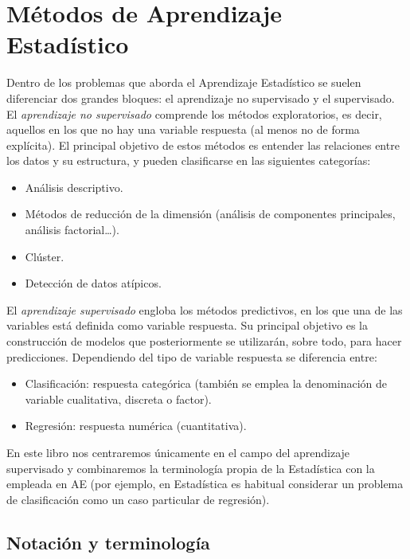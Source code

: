 \documentclass[
  spanish,
]{book}
\theoremstyle{break}
\theoremstyle{definition}
\theoremstyle{definition}
\theoremstyle{definition}
\theoremstyle{remark}
\begin{document}
\hypertarget{muxe9todos-de-aprendizaje-estaduxedstico}{%
\section{Métodos de Aprendizaje Estadístico}\label{muxe9todos-de-aprendizaje-estaduxedstico}}

Dentro de los problemas que aborda el Aprendizaje Estadístico se suelen diferenciar dos grandes bloques: el aprendizaje no supervisado y el supervisado. El \emph{aprendizaje no supervisado} comprende los métodos exploratorios, es decir, aquellos en los que no hay una variable respuesta (al menos no de forma explícita). El principal objetivo de estos métodos es entender las relaciones entre los datos y su estructura, y pueden clasificarse en las siguientes categorías:

\begin{itemize}
\item
  Análisis descriptivo.
\item
  Métodos de reducción de la dimensión (análisis de componentes principales, análisis factorial\ldots).
\item
  Clúster.
\item
  Detección de datos atípicos.
\end{itemize}

El \emph{aprendizaje supervisado} engloba los métodos predictivos, en los que una de las variables está definida como variable respuesta. Su principal objetivo es la construcción de modelos que posteriormente se utilizarán, sobre todo, para hacer predicciones. Dependiendo del tipo de variable respuesta se diferencia entre:

\begin{itemize}
\item
  Clasificación: respuesta categórica (también se emplea la denominación de variable cualitativa, discreta o factor).
\item
  Regresión: respuesta numérica (cuantitativa).
\end{itemize}

En este libro nos centraremos únicamente en el campo del aprendizaje supervisado y combinaremos la terminología propia de la Estadística con la empleada en AE (por ejemplo, en Estadística es habitual considerar un problema de clasificación como un caso particular de regresión).

\hypertarget{notacion}{%
\subsection{Notación y terminología}\label{notacion}}
\end{document}
